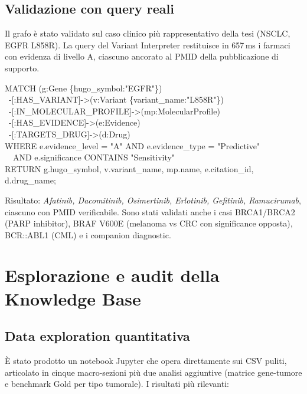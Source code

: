 \documentclass[11pt,a4paper]{article}
\begin{document}
\subsection{Validazione con query reali}
Il grafo \`e stato validato sul caso clinico pi\`u rappresentativo della tesi (NSCLC, EGFR L858R). La query del Variant Interpreter restituisce in 657\,ms i farmaci con evidenza di livello A, ciascuno ancorato al PMID della pubblicazione di supporto.

\begin{codebox}
MATCH (g:Gene \{hugo\_symbol:"EGFR"\})\\
\ -[:HAS\_VARIANT]->(v:Variant \{variant\_name:"L858R"\})\\
\ -[:IN\_MOLECULAR\_PROFILE]->(mp:MolecularProfile)\\
\ -[:HAS\_EVIDENCE]->(e:Evidence)\\
\ -[:TARGETS\_DRUG]->(d:Drug)\\
WHERE e.evidence\_level = "A" AND e.evidence\_type = "Predictive"\\
\ \ AND e.significance CONTAINS "Sensitivity"\\
RETURN g.hugo\_symbol, v.variant\_name, mp.name, e.citation\_id, d.drug\_name;
\end{codebox}

\noindent Risultato: \emph{Afatinib, Dacomitinib, Osimertinib, Erlotinib, Gefitinib, Ramucirumab}, ciascuno con PMID verificabile. Sono stati validati anche i casi BRCA1/BRCA2 (PARP inhibitor), BRAF V600E (melanoma vs CRC con significance opposta), BCR::ABL1 (CML) e i companion diagnostic.

\section{Esplorazione e audit della Knowledge Base}

\subsection{Data exploration quantitativa}
\`E stato prodotto un notebook Jupyter che opera direttamente sui CSV puliti, articolato in cinque macro-sezioni pi\`u due analisi aggiuntive (matrice gene-tumore e benchmark Gold per tipo tumorale). I risultati pi\`u rilevanti:
\end{document}

